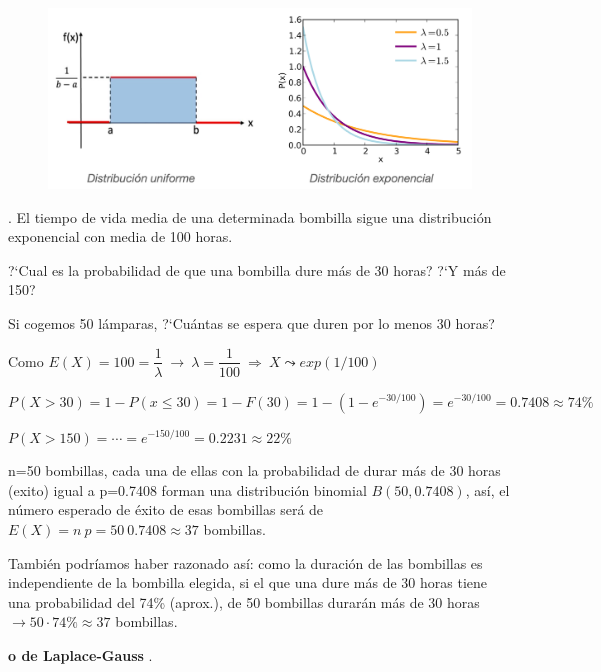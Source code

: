 \begin{figure}[H]
	\centering
	\includegraphics[width=1\textwidth]{imagenes/imagenes04/T04IM11.png}
	\end{figure}
	
\begin{example}
.	El tiempo de vida media de una determinada bombilla sigue una distribución exponencial con media de 100 horas.

?`Cual es la probabilidad de que una bombilla dure más de 30 horas? ?`Y más de 150?

Si cogemos 50 lámparas, ?`Cuántas se espera que duren por lo menos 30 horas?	

\vspace{2mm} Como $E(X)=100=\dfrac 1 \lambda \ \to \ \lambda = \dfrac 1 {100} \ \Rightarrow \ X\leadsto exp(1/100)$


$P(X>30)=1-P(x\le 30)=1-F(30)=1-(1-e^{-30/100})=e^{-30/100}=0.7408\approx 74\%$

$P(X>150)=\cdots=e^{-150/100}=0.2231\approx 22\%$

\vspace{2mm} n=50 bombillas, cada una de ellas con la probabilidad de durar más de 30 horas (exito) igual a p=0.7408 forman una distribución binomial $B(50,0.7408)$, así, el número esperado de éxito de esas bombillas será de $E(X)=n\ p=50\ 0.7408 \approx 37$ bombillas.

\vspace{2mm} \textcolor{gris}{También podríamos haber razonado así: como la duración de las bombillas es independiente de la bombilla elegida, si el que una dure más de 30 horas tiene una probabilidad del 74\% (aprox.), de 50 bombillas durarán más de 30 horas $\to 50 \cdot 74\% \approx 37$ bombillas.}
\end{example}
	
	

\vspace{5mm}\textbf{\Large{}}\large{ \textbf{o de Laplace-Gauss}} \normalsize{.}

